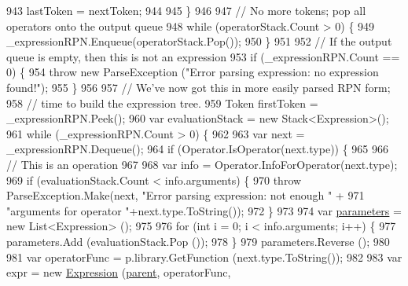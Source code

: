 \begin{DoxyCode}
943                     lastToken = nextToken;
944 
945                 \}
946 
947                 \textcolor{comment}{// No more tokens; pop all operators onto the output queue}
948                 \textcolor{keywordflow}{while} (operatorStack.Count > 0) \{
949                     \_expressionRPN.Enqueue(operatorStack.Pop());
950                 \}
951 
952                 \textcolor{comment}{// If the output queue is empty, then this is not an expression}
953                 \textcolor{keywordflow}{if} (\_expressionRPN.Count == 0) \{
954                     \textcolor{keywordflow}{throw} \textcolor{keyword}{new} ParseException (\textcolor{stringliteral}{"Error parsing expression: no expression found!"});
955                 \}
956 
957                 \textcolor{comment}{// We've now got this in more easily parsed RPN form;}
958                 \textcolor{comment}{// time to build the expression tree.}
959                 Token firstToken = \_expressionRPN.Peek();
960                 var evaluationStack = \textcolor{keyword}{new} Stack<Expression>();
961                 \textcolor{keywordflow}{while} (\_expressionRPN.Count > 0) \{
962 
963                     var next = \_expressionRPN.Dequeue();
964                     \textcolor{keywordflow}{if} (Operator.IsOperator(next.type)) \{
965 
966                         \textcolor{comment}{// This is an operation}
967 
968                         var info = Operator.InfoForOperator(next.type);
969                         \textcolor{keywordflow}{if} (evaluationStack.Count < info.arguments) \{
970                             \textcolor{keywordflow}{throw} ParseException.Make(next, \textcolor{stringliteral}{"Error parsing expression: not enough "} +
971                                 \textcolor{stringliteral}{"arguments for operator "}+next.type.ToString());
972                         \}
973 
974                         var \hyperlink{a00098_a7b21380bead8ae08b2cfc6594edab32c}{parameters} = \textcolor{keyword}{new} List<Expression> ();
975 
976                         \textcolor{keywordflow}{for} (\textcolor{keywordtype}{int} i = 0; i < info.arguments; i++) \{
977                             parameters.Add (evaluationStack.Pop ());
978                         \}
979                         parameters.Reverse ();
980 
981                         var operatorFunc = p.library.GetFunction (next.type.ToString());
982 
983                         var expr = \textcolor{keyword}{new} \hyperlink{a00098_a17e5101d02b96d0071e7a0223e4daa3d}{Expression} (\hyperlink{a00142_af313a82103fcc2ff5a177dbb06b92f7b}{parent}, operatorFunc, 

\end{DoxyCode}
